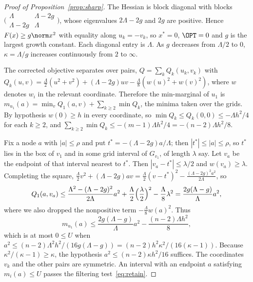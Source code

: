 \begin{proof}[Proof of Proposition~\ref{prop:sharp}]
The Hessian is block diagonal with blocks
$\bigl(\begin{smallmatrix}\Lambda&\Lambda-2g\\\Lambda-2g&\Lambda\end{smallmatrix}\bigr)$,
whose eigenvalues $2\Lambda-2g$ and $2g$ are positive. Hence
$F(x)\ge g\norm x^2$ with equality along $u_k=-v_k$, so $x^*=0$, $\OPT=0$ and
$g$ is the largest growth constant. Each diagonal entry is $\Lambda$. As $g$
decreases from $\Lambda/2$ to $0$, $\kappa=\Lambda/g$ increases continuously
from $2$ to $\infty$.

The corrected objective separates over pairs, $Q=\sum_kQ_k(u_k,v_k)$ with
$Q_k(u,v)=\frac\Lambda2(u^2+v^2)+(\Lambda-2g)uv-\frac\Lambda8(w(u)^2+w(v)^2)$,
where $w$ denotes $w_i$ in the relevant coordinate. Therefore the min-marginal
of $u_1$ is $m_{u_1}(a)=\min_vQ_1(a,v)+\sum_{k\ge2}\min Q_k$, the minima taken
over the grids. By hypothesis $w(0)\ge h$ in every coordinate, so
$\min Q_k\le Q_k(0,0)\le-\Lambda h^2/4$ for each $k\ge2$, and
$\sum_{k\ge2}\min Q_k\le-(m-1)\Lambda h^2/4=-(n-2)\Lambda h^2/8$.

Fix a node $a$ with $|a|\le\rho$ and put $t^*=-(\Lambda-2g)a/\Lambda$; then
$|t^*|\le|a|\le\rho$, so $t^*$ lies in the box of $v_1$ and in some grid
interval of $G_{v_1}$, of length $\lambda$ say. Let $v_a$ be the endpoint of
that interval nearest to $t^*$. Then $|v_a-t^*|\le\lambda/2$ and
$w(v_a)\ge\lambda$. Completing the square,
$\frac\Lambda2v^2+(\Lambda-2g)av=\frac\Lambda2(v-t^*)^2
-\frac{(\Lambda-2g)^2a^2}{2\Lambda}$, so
\[
Q_1(a,v_a)\le\frac{\Lambda^2-(\Lambda-2g)^2}{2\Lambda}a^2
+\frac\Lambda2\Bigl(\frac\lambda2\Bigr)^2-\frac\Lambda8\lambda^2
=\frac{2g(\Lambda-g)}{\Lambda}a^2 ,
\]
where we also dropped the nonpositive term $-\frac\Lambda8w(a)^2$. Thus
\[
m_{u_1}(a)\le\frac{2g(\Lambda-g)}{\Lambda}a^2-\frac{(n-2)\Lambda h^2}8,
\]
which is at most $0\le U$ when
$a^2\le(n-2)\Lambda^2h^2/(16g(\Lambda-g))=(n-2)h^2\kappa^2/(16(\kappa-1))$.
Because $\kappa^2/(\kappa-1)\ge\kappa$, the hypothesis
$a^2\le(n-2)\kappa h^2/16$ suffices. The coordinates $v_k$ and the other
pairs are symmetric. An interval with an endpoint $a$ satisfying
$m_i(a)\le U$ passes the filtering test~\eqref{eq:retain}.
\end{proof}

